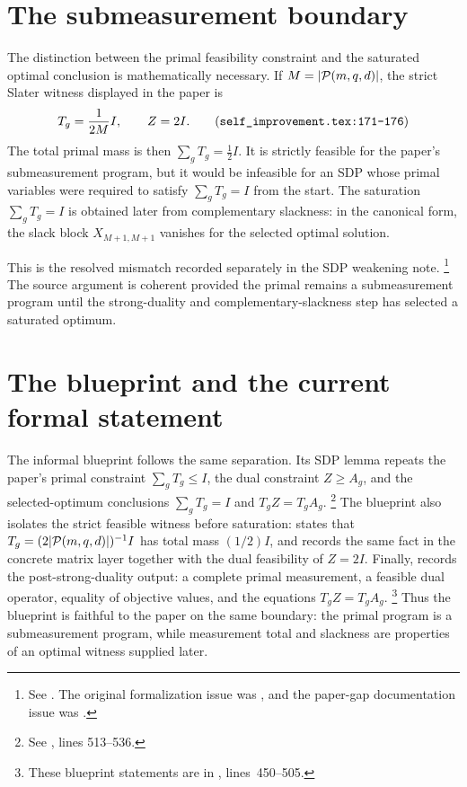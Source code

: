 \documentclass[11pt]{article}
\begin{document}
\section{The submeasurement boundary}

The distinction between the primal feasibility constraint and the saturated
optimal conclusion is mathematically necessary.  If
$M=|\mathcal{P}(m, q, d)|$, the strict Slater witness displayed in the paper is
\[
  T_g = \frac{1}{2M}I,
  \qquad
  Z=2I.
  \tag{\texttt{self\_improvement.tex:171--176}}
\]
The total primal mass is then $\sum_g T_g=\frac12 I$.  It is strictly feasible
for the paper's submeasurement program, but it would be infeasible for an
SDP whose primal variables were required to satisfy $\sum_gT_g=I$ from the
start.  The saturation $\sum_gT_g=I$ is obtained later from complementary
slackness: in the canonical form, the slack block $X_{M+1,M+1}$ vanishes for
the selected optimal solution.

This is the resolved mismatch recorded separately in the SDP weakening note.%
\footnote{See .  The original
formalization issue was , and the paper-gap documentation issue was
.}
The source argument is coherent provided the primal remains a submeasurement
program until the strong-duality and complementary-slackness step has selected a
saturated optimum.

\section{The blueprint and the current formal statement}

The informal blueprint follows the same separation.  Its SDP lemma repeats the
paper's primal constraint $\sum_gT_g\le I$, the dual constraint $Z\ge A_g$, and
the selected-optimum conclusions $\sum_gT_g=I$ and $T_gZ=T_gA_g$.%
\footnote{See , lines
513--536.}
The blueprint also isolates the strict feasible witness before saturation:
 states that
$T_g=(2|\mathcal{P}(m, q, d)|)^{-1}I$ has total mass $(1/2)I$, and
 records the same fact in the concrete
matrix layer together with the dual feasibility of $Z=2I$.  Finally,
 records the post-strong-duality output:
a complete primal measurement, a feasible dual operator, equality of objective
values, and the equations $T_gZ=T_gA_g$.%
\footnote{These blueprint statements are in
, lines~450--505.}
Thus the blueprint is faithful to the paper on the same boundary: the primal
program is a submeasurement program, while measurement total and slackness are
properties of an optimal witness supplied later.
\end{document}
